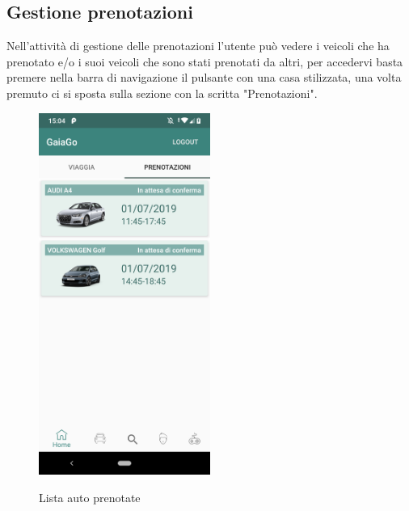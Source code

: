 \subsection{Gestione prenotazioni}
\label{gestione}
Nell'attività di gestione delle prenotazioni l'utente può vedere i veicoli che ha prenotato e/o i suoi veicoli che sono stati prenotati da altri, per accedervi basta premere nella barra di navigazione il pulsante con una casa stilizzata, una volta premuto ci si sposta sulla sezione con la scritta "Prenotazioni".
  \begin{figure}[H] 
	\centering 
	\includegraphics[width=0.5\textwidth]{res/images/prenotazione_effettuata.png}\\
	\caption{Lista auto prenotate}
	\label{prenotate}
\end{figure}
\pagebreak


